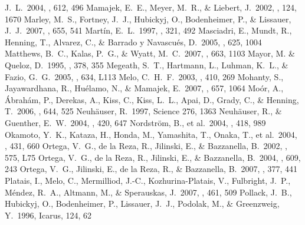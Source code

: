 \documentclass[11pt,twoside]{book}
\begin{document}
\begin{thebibliography}{}
J.~L.\ 2004, \apj, 612, 496
Mamajek, E.~E., Meyer, M.~R., \& Liebert, J.\ 2002, \aj, 124, 1670
Marley, M.~S., Fortney, J.~J., Hubickyj, O., Bodenheimer, P., \& Lissauer,
J.~J.\ 2007, \apj, 655, 541
Mart\'{i}n, E.~L.\ 1997, \aap, 321, 492
Masciadri, E., Mundt, R., Henning, T., Alvarez, C., \& Barrado y Navascu{\'e}s,
D.\ 2005, \apj, 625, 1004
Matthews, B.~C., Kalas, P.~G., \& Wyatt, M.~C.\ 2007, \apj, 663, 1103
Mayor, M. \& Queloz, D.\ 1995, \nat, 378, 355
Megeath, S.~T., Hartmann, L., Luhman, K.~L., \& Fazio, G.~G.\ 2005, \apjl, 634, L113
{Melo}, C.~H.~F.\ 2003, \aap, 410, 269
Mohanty, S., Jayawardhana, R., Hu{\'e}lamo, N., \& Mamajek, E.\ 2007, \apj, 657, 1064
Mo{\'o}r, A., {\'A}brah{\'a}m, P., Derekas, A., Kiss, C., Kiss, L.~L., Apai, D.,
Grady, C., \& Henning, T.\ 2006, \apj, 644, 525
{Neuh\"{a}user}, R.\ 1997, Science 276, 1363
Neuh{\"a}user, R., \& Guenther, E.~W.\ 2004, \aap, 420, 647
Nordstr{\"o}m, B., et al.\ 2004, \aap, 418, 989
Okamoto, Y.~K., {Kataza}, H., {Honda}, M., {Yamashita}, T., {Onaka}, T.,
et al.\ 2004, \nat, 431, 660
{Ortega}, V.~G., {de la Reza}, R., {Jilinski}, E., \& {Bazzanella}, B.\ 2002,
\apjl, 575, {L75}
{Ortega}, V.~G., {de la Reza}, R., {Jilinski}, E., \& {Bazzanella}, B.\ 2004,
\apj, 609, {243}
{Ortega}, V.~G., {Jilinski}, E., {de la Reza}, R., \& {Bazzanella}, B.\ 2007,
\mnras, 377, 441
Platais, I., Melo, C., Mermilliod, J.-C., Kozhurina-Platais, V., Fulbright,
J.~P., M{\'e}ndez, R.~A., Altmann, M., \& Sperauskas, J.\ 2007, \aap, 461, 509
Pollack, J.~B., Hubickyj, O., Bodenheimer, P., Lissauer, J.~J., Podolak, M., \&
Greenzweig, Y.\ 1996, Icarus, 124, 62

\end{thebibliography}
\end{document}
